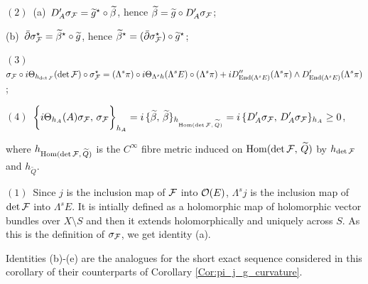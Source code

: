 \documentclass[12pt]{article}
\begin{document}
\begin{Cor}
\vspace{1ex}

$(2)$\, (a)\, $D'_A\sigma_{\cal F} = \widetilde{g}^\star\circ\widetilde\beta$, \hspace{2ex} hence \hspace{2ex} $\widetilde\beta = \widetilde{g}\circ D'_A\sigma_{\cal F}$;
  
\vspace{1ex}

\hspace{3ex} (b)\, $\bar\partial\sigma_{\cal F}^\star = \widetilde\beta^\star\circ\widetilde{g}$, \hspace{4ex} hence \hspace{4ex} $\widetilde\beta^\star = (\bar\partial\sigma_{\cal F}^\star)\circ\widetilde{g}^\star$;

\vspace{2ex}

$(3)$\, $\displaystyle\sigma_{\cal F}\circ i\Theta_{h_{\det\cal F}}(\det{\cal F})\circ\sigma_{\cal F}^\star = (\Lambda^s\pi)\circ i\Theta_{\Lambda^sh}(\Lambda^sE)\circ(\Lambda^s\pi) + i D''_{\operatorname{End}(\Lambda^sE)}(\Lambda^s\pi)\wedge D'_{\operatorname{End}(\Lambda^sE)}(\Lambda^s\pi)$;

\vspace{2ex}

$(4)$\, $\displaystyle\bigg\{i\Theta_{h_A}(A)\sigma_{\cal F},\,\sigma_{\cal F}\bigg\}_{h_A} = i\,\{\widetilde\beta,\,\widetilde\beta\}_{h_{\operatorname{Hom}(\det{\cal F},\,\widetilde{Q})}} = i\,\{D'_A\sigma_{\cal F},\,D'_A\sigma_{\cal F}\}_{h_A} \geq 0$,

\noindent where $h_{\operatorname{Hom}(\det{\cal F},\,\widetilde{Q})}$ is the $C^\infty$ fibre metric induced on $\operatorname{Hom}(\det{\cal F},\,\widetilde{Q})$ by $h_{\det\cal F}$ and $h_{\widetilde{Q}}$.



\end{Cor}  

 $(1)$\, Since $j$ is the inclusion map of ${\cal F}$ into ${\cal O}(E)$, $\Lambda^sj$ is the inclusion map of $\det{\cal F}$ into $\Lambda^sE$. It is intially defined as a holomorphic map of holomorphic vector bundles over $X\setminus S$ and then it extends holomorphically and uniquely across $S$. As this is the definition of $\sigma_{\cal F}$, we get identity (a). 

Identities (b)-(e) are the analogues for the short exact sequence considered in this corollary of their counterparts of Corollary \ref{Cor:pi_j_g_curvature}.
\end{document}
